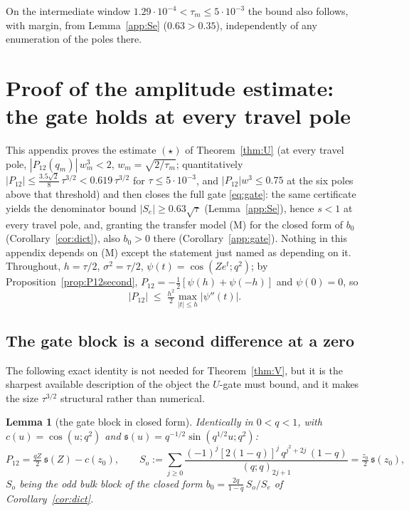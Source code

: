 \documentclass[11pt]{article}
\theoremstyle{plain}
\newtheorem{lemma}[theorem]{Lemma}
\theoremstyle{definition}
\theoremstyle{remark}
\begin{document}
\noindent On the intermediate window $1.29\cdot10^{-4}<\tau_m\le5\cdot10^{-3}$ the bound also
follows, with margin, from Lemma~\ref{app:Se} ($0.63>0.35$), independently of any enumeration of
the poles there.

\section{Proof of the amplitude estimate: the gate holds at every travel pole}\label{app:star}

This appendix proves the estimate $(\star)$ of Theorem~\ref{thm:U} (at every travel pole,
$|P_{12}(q_m)|\,w_m^3<2$, $w_m=\sqrt{2/\tau_m}$; quantitatively
$|P_{12}|\le\tfrac{3.5\sqrt2}8\,\tau^{3/2}<0.619\,\tau^{3/2}$ for $\tau\le5\cdot10^{-3}$, and
$|P_{12}|w^3\le0.75$ at the six poles above that threshold) and then closes the full gate
\eqref{eq:gate}: the same certificate yields the denominator bound $|S_e|\ge0.63\sqrt\tau$
(Lemma~\ref{app:Se}), hence $s<1$ at every travel pole, and, granting the transfer model
\textup{(M)} for the closed form of $b_0$ (Corollary~\ref{cor:dict}), also $b_0>0$ there
(Corollary~\ref{app:gate}). Nothing in this appendix depends on \textup{(M)} except the statement
just named as depending on it.
Throughout, $h=\tau/2$, $\sigma^2=\tau/2$, $\psi(t)=\cos(Ze^{t};q^2)$; by
Proposition~\ref{prop:P12second}, $P_{12}=-\tfrac12[\psi(h)+\psi(-h)]$ and $\psi(0)=0$, so
\begin{equation}\label{eq:taylorgate}
 |P_{12}|\;\le\;\tfrac{h^2}2\max_{|t|\le h}|\psi''(t)| .
\end{equation}

\subsection*{The gate block is a second difference at a zero}

The following exact identity is not needed for Theorem~\ref{thm:V}, but it is the sharpest
available description of the object the $U$-gate must bound, and it makes the size
$\tau^{3/2}$ structural rather than numerical.

\begin{lemma}[the gate block in closed form]\label{lem:P12closed}
Identically in $0<q<1$, with $c(u)=\cos(u;q^2)$ and $\mathfrak s(u)=q^{-1/2}\sin(q^{1/2}u;q^2)$:
\[
 P_{12}=\tfrac{qZ}2\,\mathfrak s(Z)-c(z_0),\qquad
 S_o:=\sum_{j\ge0}\frac{(-1)^j[2(1-q)]^j\,q^{j^2+2j}\,(1-q)}{(q;q)_{2j+1}}=\tfrac{z_0}2\,\mathfrak s(z_0),
\]
$S_o$ being the odd bulk block of the closed form $b_0=\tfrac{2q}{1-q}\,S_o/S_e$ of
Corollary~\ref{cor:dict}.
\end{lemma}
\end{document}
